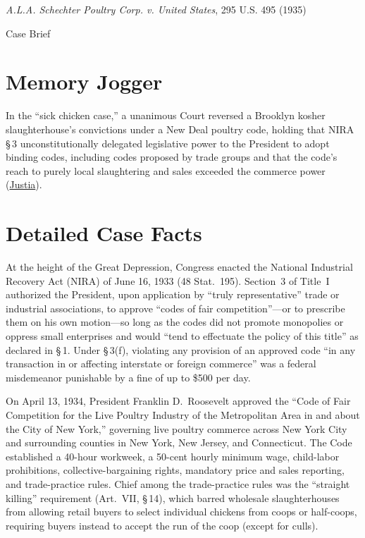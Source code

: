 \documentclass[12pt]{article}
\begin{document}
\begin{center}
{\LARGE \textit{A.L.A. Schechter Poultry Corp. v. United States}, 295 U.S. 495 (1935)\par}
\vspace{0.8em}
{\large Case Brief\par}
\end{center}
\vspace{1em}

\section{Memory Jogger}
In the ``sick chicken case,'' a unanimous Court reversed a Brooklyn kosher slaughterhouse's convictions under a New Deal poultry code, holding that NIRA \S\,3 unconstitutionally delegated legislative power to the President to adopt binding codes, including codes proposed by trade groups and that the code's reach to purely local slaughtering and sales exceeded the commerce power (\href{https://supreme.justia.com/cases/federal/us/295/495/}{Justia}).

\section{Detailed Case Facts}
At the height of the Great Depression, Congress enacted the National Industrial Recovery Act (NIRA) of June 16, 1933 (48 Stat.\ 195). Section~3 of Title~I authorized the President, upon application by ``truly representative'' trade or industrial associations, to approve ``codes of fair competition''---or to prescribe them on his own motion---so long as the codes did not promote monopolies or oppress small enterprises and would ``tend to effectuate the policy of this title'' as declared in \S\,1. Under \S\,3(f), violating any provision of an approved code ``in any transaction in or affecting interstate or foreign commerce'' was a federal misdemeanor punishable by a fine of up to \$500 per day.

On April 13, 1934, President Franklin D.\ Roosevelt approved the ``Code of Fair Competition for the Live Poultry Industry of the Metropolitan Area in and about the City of New York,'' governing live poultry commerce across New York City and surrounding counties in New York, New Jersey, and Connecticut. The Code established a 40-hour workweek, a 50-cent hourly minimum wage, child-labor prohibitions, collective-bargaining rights, mandatory price and sales reporting, and trade-practice rules. Chief among the trade-practice rules was the ``straight killing'' requirement (Art.\ VII, \S\,14), which barred wholesale slaughterhouses from allowing retail buyers to select individual chickens from coops or half-coops, requiring buyers instead to accept the run of the coop (except for culls).
\end{document}
